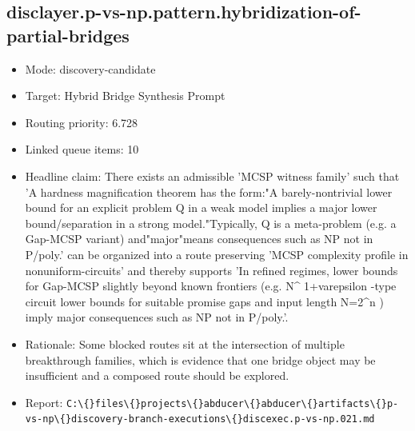 \documentclass[11pt]{article}
\begin{document}
\subsection*{disclayer.p-vs-np.pattern.hybridization-of-partial-bridges}
\begin{itemize}
\item Mode: discovery-candidate
\item Target: Hybrid Bridge Synthesis Prompt
\item Routing priority: 6.728
\item Linked queue items: 10
\item Headline claim: There exists an admissible 'MCSP witness family' such that 'A hardness magnification theorem has the form:"A barely-nontrivial lower bound for an explicit problem Q in a weak model implies a major lower bound/separation in a strong model."Typically, Q is a meta-problem (e.g. a Gap-MCSP variant) and"major"means consequences such as NP not in P/poly.' can be organized into a route preserving 'MCSP complexity profile in nonuniform-circuits' and thereby supports 'In refined regimes, lower bounds for Gap-MCSP slightly beyond known frontiers (e.g. N\textasciicircum{} 1+varepsilon -type circuit lower bounds for suitable promise gaps and input length N=2\textasciicircum{}n ) imply major consequences such as NP not in P/poly.'.
\item Rationale: Some blocked routes sit at the intersection of multiple breakthrough families, which is evidence that one bridge object may be insufficient and a composed route should be explored.
\item Report: \texttt{C:\textbackslash\{\}files\textbackslash\{\}projects\textbackslash\{\}abducer\textbackslash\{\}abducer\textbackslash\{\}artifacts\textbackslash\{\}p-vs-np\textbackslash\{\}discovery-branch-executions\textbackslash\{\}discexec.p-vs-np.021.md}
\end{itemize}
\end{document}
